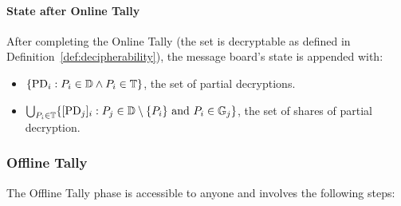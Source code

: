 \documentclass[runningheads]{llncs}
\begin{document}
\paragraph{State after Online Tally}

After completing the Online Tally (the set is decryptable as defined in Definition~\ref{def:decipherability}), the message board's state is appended with:
\begin{itemize}
    \item $\{\mathrm{PD}_{i} :  P_{i} \in \mathbb{D} \land P_{i} \in \mathbb{T}\}$, the set of partial decryptions.
    
    \item $\bigcup_{P_{i} \in \mathbb{T}} \{[\mathrm{PD}_{j}]_{i} : P_{j} \in \mathbb{D} \setminus \{P_{i}\} \text{ and } P_{i} \in \mathbb{G}_{j}\}$, the set of shares of partial decryption.
\end{itemize}

\subsubsection{Offline Tally}

The Offline Tally phase is accessible to anyone and involves the following steps:
\end{document}
